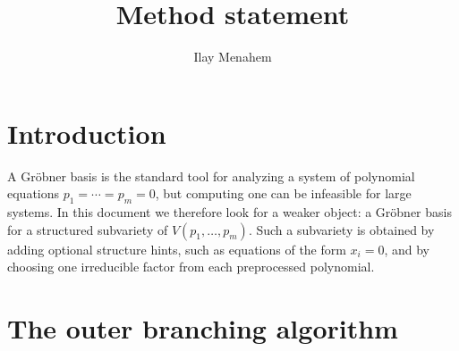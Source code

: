 \documentclass[12pt]{article}
\title{Method statement}
\author{Ilay Menahem}
\begin{document}
\maketitle

\section*{Introduction}

A Gr\"obner basis is the standard tool for analyzing a system of polynomial equations $p_1 = \cdots = p_m = 0$, but computing one can be infeasible for large systems.
In this document we therefore look for a weaker object: a Gr\"obner basis for a structured subvariety of $V(p_1, \ldots, p_m)$. Such a subvariety is obtained by adding optional structure hints, such as equations of the form $x_i = 0$, and by choosing one irreducible factor from each preprocessed polynomial.

\section*{The outer branching algorithm}
\end{document}
